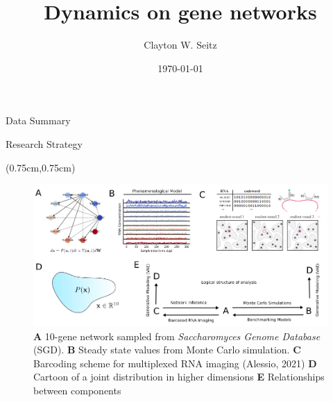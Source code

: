 \documentclass[aspectratio=1610]{beamer}					%
\title{Dynamics on gene networks}	%
\author{Clayton W. Seitz}								%
\date{\today}									%
\begin{document}
\begin{frame}
  \titlepage
\end{frame}

%

\begin{frame}{Data Summary}


\end{frame}

\begin{frame}{Research Strategy}

\begin{textblock*}{14cm}(0.75cm,0.75cm)
\begin{figure}
\includegraphics[width=14cm]{logic.png}
\caption{\textbf{A} 10-gene network sampled from \emph{Saccharomyces Genome Database} (SGD). \textbf{B} Steady state values from Monte Carlo simulation. \textbf{C} Barcoding scheme for multiplexed RNA imaging (Alessio, 2021) \textbf{D} Cartoon of a joint distribution in higher dimensions \textbf{E} Relationships between components}
\end{figure}
\end{textblock*}

\end{frame}
\end{document}
